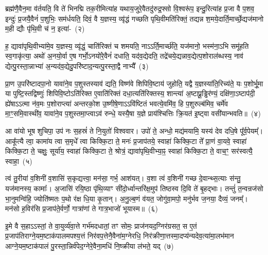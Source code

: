 ब्रह्म॑णै॒वैन॒मा व॑र्तयति॒ वि ते॑ भिनद्मि तक॒रीमित्या॑ह यथाय॒जुरे॒वैतदु॑रुद्र॒फ्सो वि॒श्वरू॑प॒ इन्दु॒रित्या॑ह प्र॒जा वै प॒शव॒ इन्दुः॑ प्र॒जयै॒वैनं॑ प॒शुभिः॒ सम॑र्धयति॒ दिवं॒ वै य॒ज्ञस्य॒ व्यृ॑द्धं गच्छति पृथि॒वीमति॑रिक्तं॒ तद्यन्न श॒मये॒दार्ति॒मार्च्छे॒द्यज॑मानो म॒ही द्यौः पृ॑थि॒वी च॑ न॒ इत्या॑-~(२)\ip

ह॒ द्यावा॑\-पृथि॒वीभ्या॑मे॒व य॒ज्ञस्य॒ व्यृ॑द्धं॒ चाति॑रिक्तं च शमयति॒ नाऽऽर्ति॒मार्च्छ॑ति॒ यज॑मानो॒ भस्म॑ना॒\-ऽभि समू॑हति स्व॒गाकृ॑त्या॒ अथो॑ अ॒नयो॒र्वा ए॒ष गर्भो॒\-ऽनयो॑रे॒वैनं॑ दधाति॒ यद॑व॒द्येदति॒ तद्रे॑चये॒द्यन्नाव॒द्येत्प॒शोराल॑ब्धस्य॒ नाव॑ द्येत्पु॒रस्ता॒न्नाभ्या॑ अ॒न्यद॑व॒द्येदु॒परि॑ष्टाद॒न्यत्पु॒रस्ता॒द्वै नाभ्यै᳚~(३)\ip

प्रा॒ण उ॒परि॑ष्टादपा॒नो यावा॑ने॒व प॒शुस्तस्याव॑ द्यति॒ विष्ण॑वे शिपिवि॒ष्टाय॑ जुहोति॒ यद्वै य॒ज्ञस्या॑ति॒रिच्य॑ते॒ यः प॒शोर्भू॒मा या पुष्टि॒स्तद्विष्णुः॑ शिपिवि॒ष्टो\-ऽति॑रिक्त ए॒वाति॑रिक्तं दधा॒त्यति॑रिक्तस्य॒ शान्त्या॑ अ॒ष्टाप्रू॒ड्ढिर॑ण्यं॒ दक्षि॑णा॒\-ऽष्टाप॑दी॒ ह्ये॑षा\-ऽऽ\-\-त्मा न॑व॒मः प॒शोराप्त्या॑ अन्तरको॒श उ॒ष्णीषे॒णा\-ऽऽ\-\-वि॑ष्टितं भवत्ये॒वमि॑व॒ हि प॒शुरुल्ब॑मिव॒ चर्मे॑व मा॒ꣳ॒समि॒वास्थी॑व॒ यावा॑ने॒व प॒शुस्तमा॒प्त्वा\-ऽ\-व॑ रुन्धे॒ यस्यै॒षा य॒ज्ञे प्राय॑श्चित्तिः क्रि॒यत॑ इ॒ष्ट्वा वसी॑यान्भवति॥~(४)\ip

{\anuvakamend[{व॒र्त॒येत्या॑ह न॒ इति॒ वै नाभ्या॒ उल्ब॑मि॒वैक॑विꣳशतिश्च}]}

आ वा॑यो भूष शुचिपा॒ उप॑ नः स॒हस्रं॑ ते नि॒युतो॑ विश्ववार। उपो॑ ते॒ अन्धो॒ मद्य॑मयामि॒ यस्य॑ देव दधि॒षे पू᳚र्व॒पेयम्᳚। आकू᳚त्यै त्वा॒ कामा॑य त्वा स॒मृधे᳚ त्वा किक्कि॒टा ते॒ मनः॑ प्र॒जा\-प॑तये॒ स्वाहा॑ किक्कि॒टा ते᳚ प्रा॒णं वा॒यवे॒ स्वाहा॑ किक्कि॒टा ते॒ चक्षुः॒ सूर्या॑य॒ स्वाहा॑ किक्कि॒टा ते॒ श्रोत्रं॒ द्यावा॑\-पृथि॒वीभ्या॒ꣴ॒ स्वाहा॑ किक्कि॒टा ते॒ वाच॒ꣳ॒ सर॑स्वत्यै॒ स्वाहा॒~(५)\ip

त्वं तु॒रीया॑ व॒शिनी॑ व॒शासि॑ स॒कृद्यत्त्वा॒ मन॑सा॒ गर्भ॒ आश॑यत्। व॒शा त्वं व॒शिनी॑ गच्छ दे॒वान्थ्स॒त्याः स॑न्तु॒ यज॑मानस्य॒ कामाः᳚। अ॒जासि॑ रयि॒ष्ठा पृ॑थि॒व्याꣳ सी॑दो॒र्ध्वान्तरि॑क्ष॒मुप॑ तिष्ठस्व दि॒वि ते॑ बृ॒हद्भाः। तन्तुं॑ त॒न्वन्रज॑सो भा॒नुमन्वि॑हि॒ ज्योति॑ष्मतः प॒थो र॑क्ष धि॒या कृ॒तान्। अ॒नु॒ल्ब॒णं व॑यत॒ जोगु॑वा॒मपो॒ मनु॑र्भव ज॒नया॒ दैव्यं॒ जनम्᳚। मन॑सो ह॒विर॑सि प्र॒जा\-प॑ते॒र्वर्णो॒ गात्रा॑णां ते गात्र॒भाजो॑ भूयास्म॥~(६)\ip

{\anuvakamend[{सर॑स्वत्यै॒ स्वाहा॒ मनु॒स्त्रयो॑दश च}]}

इ॒मे वै स॒हा\-ऽऽ\-स्तां॒ ते वा॒युर्व्य॑वा॒त्ते गर्भ॑मदधातां॒ तꣳ सोमः॒ प्राज॑नयद॒ग्निर॑ग्रसत॒ स ए॒तं प्र॒जा\-प॑तिराग्ने॒यम॒ष्टाक॑पाल\-मपश्य॒त्तं निर॑\-वप॒त्तेनै॒वैना॑म॒ग्नेरधि॒ निर॑क्रीणा॒त्तस्मा॒दप्य॑न्य\-देव॒त्या॑\-मा॒लभ॑मान आ\-ग्ने॒य\-म॒ष्टाक॑पालं पु॒रस्ता॒न्निर्व॑पेद॒ग्ने\-रे॒वैना॒मधि॑ नि॒ष्क्रीया ल॑भते॒ यद्~(७)\ip

